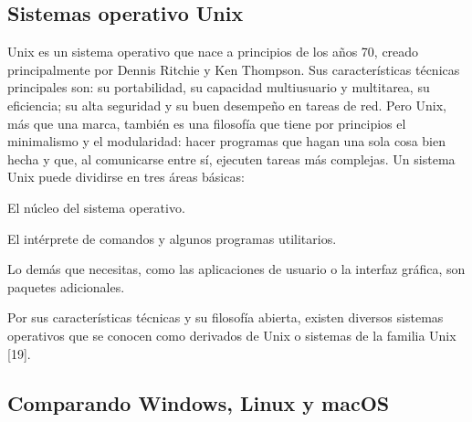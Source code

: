 \subsection{Sistemas operativo Unix}

\begin{list}{}%
    {\setlength{\leftmargin}{1cm}\setlength{\rightmargin}{1cm}}
    \item\relax
    \small

Unix es un sistema operativo que nace a principios de los años 70, creado principalmente por Dennis Ritchie y Ken Thompson. Sus características técnicas principales son: su portabilidad, su capacidad multiusuario y multitarea, su eficiencia; su alta seguridad y su buen desempeño en tareas de red. Pero Unix, más que una marca, también es una filosofía que tiene por principios el minimalismo y el modularidad: hacer programas que hagan una sola cosa bien hecha y que, al comunicarse entre sí, ejecuten tareas más complejas.
Un sistema Unix puede dividirse en tres áreas básicas: 

        El núcleo del sistema operativo.

        El intérprete de comandos y algunos programas utilitarios.

        Lo demás que necesitas, como las aplicaciones de usuario o la interfaz gráfica, son paquetes adicionales.

Por sus características técnicas y su filosofía abierta, existen diversos sistemas operativos que se conocen como derivados de Unix o sistemas de la familia Unix [19].

\end{list}


\subsection{Comparando Windows, Linux y macOS}

